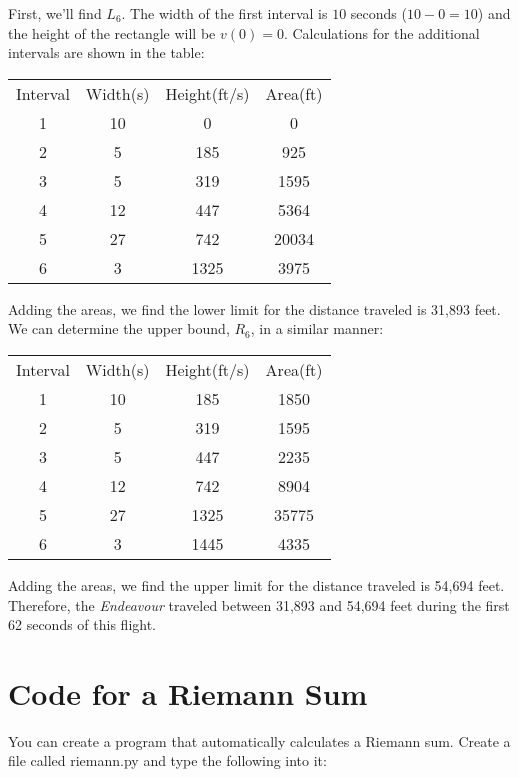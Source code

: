 First, we'll find $L_6$. The width of the first interval is $10$ seconds ($10-0=10$) and the height of the rectangle will be $v(0) = 0$. Calculations for the additional intervals are shown in the table:
\begin{center}
\begin{tabular}{c|c|c|c}
	Interval & Width(s) & Height(ft/s) & Area(ft) \\
	1 & 10 & 0 & 0 \\
	2 & 5 & 185 & 925 \\
	3 & 5 & 319 & 1595 \\
	4 & 12 & 447 & 5364 \\
	5 & 27 & 742 & 20034 \\
	6 & 3 & 1325 & 3975 \\
\end{tabular}
\end{center}

Adding the areas, we find the lower limit for the distance traveled is 31,893 feet. We can determine the upper bound, $R_6$, in a similar manner:
\begin{center}
\begin{tabular}{c|c|c|c}
	Interval & Width(s) & Height(ft/s) & Area(ft) \\
	1 & 10 & 185 & 1850 \\
	2 & 5 & 319 & 1595 \\
	3 & 5 & 447 & 2235 \\
	4 & 12 & 742 & 8904 \\
	5 & 27 & 1325 & 35775 \\
	6 & 3 & 1445 & 4335 \\
\end{tabular}
\end{center}
Adding the areas, we find the upper limit for the distance traveled is 54,694 feet. Therefore, the \textit{Endeavour} traveled between 31,893 and 54,694 feet during the first 62 seconds of this flight. 

\section{Code for a Riemann Sum}
You can create a program that automatically calculates a Riemann sum. Create a file called riemann.py %
and type the following into it:

